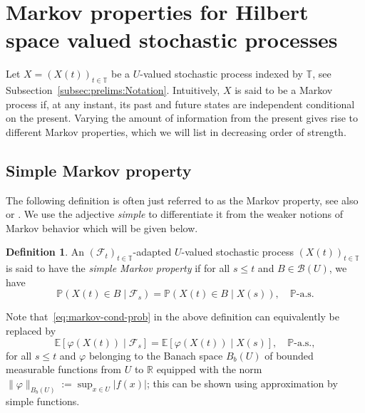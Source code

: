 \documentclass[reqno]{amsart}
\numberwithin{equation}{section}
\newcommand{\bbP}{\mathbb{P}}
\newcommand{\bbT}{\mathbb{T}}
\newcommand{\R}{\mathbb{R}}
\newcommand{\E}{\mathbb{E}}
\newcommand{\cB}{\mathcal{B}}
\newcommand{\cF}{\mathcal{F}}
\newcommand{\norm}[2]{     \| #1       \|_{ #2 }}
\theoremstyle{remark}
\theoremstyle{definition}
\newtheorem{definition}[lemma]{Definition}
\begin{document}
\section{Markov properties for Hilbert space valued stochastic processes}
\label{sec:markov-properties}
Let $X = (X(t))_{t\in\bbT}$ be a
$U$-valued stochastic process  
indexed by
$\bbT$, see Subsection~\ref{subsec:prelims:Notation}.
Intuitively, $X$ is said to be a Markov process if,
at any instant,
its past and future states
are independent conditional on the present.
Varying the amount of information from  the present gives rise to different
Markov properties, which we will list in decreasing order of strength.

\subsection{Simple Markov property}\label{subsec:markov:simple}
The following definition
is often just referred to as the Markov property, see also~\cite[p.~77]{DaPrato2014} 
or \cite[Equation~(6.2), p.\ 81]{Doob1954}.
We use the adjective \emph{simple} to differentiate it from
the weaker notions of Markov behavior which will be given below.
%
\begin{definition}\label{def:simple-markov}
	An $(\cF_t)_{t\in\bbT}$-adapted $U$-valued
	stochastic process $(X(t))_{t\in\bbT}$ is said to have
	the \emph{simple Markov property} if for all 
	$s \le t$ and
	$B \in \cB(U)$, we have
	\begin{equation}\label{eq:markov-cond-prob}
		\bbP(X(t) \in B \mid \cF_s) = \bbP(X(t) \in B \mid X(s)),
		\quad 
		\bbP\text{-a.s.}
	\end{equation}
\end{definition}

Note that~\eqref{eq:markov-cond-prob} in the above definition can equivalently be replaced by
%
\begin{equation}\label{eq:simple-Markov-phi}
	\E[\varphi(X(t)) \mid \cF_s] = \E[\varphi(X(t)) \mid X(s)], \quad \bbP\text{-a.s.},
\end{equation}
%
for all $s \le t$ and $\varphi$ belonging to the Banach space $B_b(U)$
of bounded measurable functions from 
$U$ to $\R$ equipped with the norm $\norm{\varphi}{B_b(U)} := \sup_{x \in U} |f(x)|$;
this can be
shown using approximation by simple functions.
\end{document}
